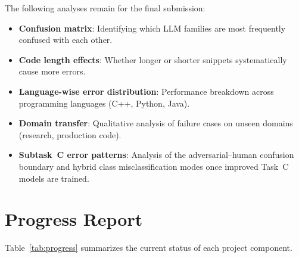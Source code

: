 \documentclass[11pt]{article}
\begin{document}
The following analyses remain for the final submission:
\begin{itemize}
    \item \textbf{Confusion matrix}: Identifying which LLM families are most frequently confused with each other.
    \item \textbf{Code length effects}: Whether longer or shorter snippets systematically cause more errors.
    \item \textbf{Language-wise error distribution}: Performance breakdown across programming languages (C++, Python, Java).
    \item \textbf{Domain transfer}: Qualitative analysis of failure cases on unseen domains (research, production code).
    \item \textbf{Subtask~C error patterns}: Analysis of the adversarial--human confusion boundary and hybrid class misclassification modes once improved Task~C models are trained.
\end{itemize}

\section{Progress Report}
\label{sec:progress}

Table~\ref{tab:progress} summarizes the current status of each project component.
\end{document}
